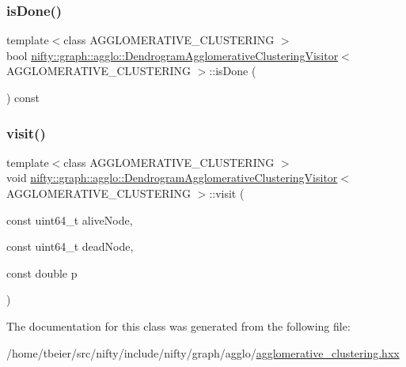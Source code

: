\subsubsection{\texorpdfstring{is\+Done()}{isDone()}}
{\footnotesize\ttfamily template$<$class A\+G\+G\+L\+O\+M\+E\+R\+A\+T\+I\+V\+E\+\_\+\+C\+L\+U\+S\+T\+E\+R\+I\+NG $>$ \\
bool \hyperlink{classnifty_1_1graph_1_1agglo_1_1DendrogramAgglomerativeClusteringVisitor}{nifty\+::graph\+::agglo\+::\+Dendrogram\+Agglomerative\+Clustering\+Visitor}$<$ A\+G\+G\+L\+O\+M\+E\+R\+A\+T\+I\+V\+E\+\_\+\+C\+L\+U\+S\+T\+E\+R\+I\+NG $>$\+::is\+Done (\begin{DoxyParamCaption}{ }\end{DoxyParamCaption}) const\hspace{0.3cm}{\ttfamily [inline]}}

\mbox{\label{classnifty_1_1graph_1_1agglo_1_1DendrogramAgglomerativeClusteringVisitor_a9335b363cf919ce31d4d366f169712ab}} 
\subsubsection{\texorpdfstring{visit()}{visit()}}
{\footnotesize\ttfamily template$<$class A\+G\+G\+L\+O\+M\+E\+R\+A\+T\+I\+V\+E\+\_\+\+C\+L\+U\+S\+T\+E\+R\+I\+NG $>$ \\
void \hyperlink{classnifty_1_1graph_1_1agglo_1_1DendrogramAgglomerativeClusteringVisitor}{nifty\+::graph\+::agglo\+::\+Dendrogram\+Agglomerative\+Clustering\+Visitor}$<$ A\+G\+G\+L\+O\+M\+E\+R\+A\+T\+I\+V\+E\+\_\+\+C\+L\+U\+S\+T\+E\+R\+I\+NG $>$\+::visit (\begin{DoxyParamCaption}\item[{const uint64\+\_\+t}]{alive\+Node,  }\item[{const uint64\+\_\+t}]{dead\+Node,  }\item[{const double}]{p }\end{DoxyParamCaption})\hspace{0.3cm}{\ttfamily [inline]}}



The documentation for this class was generated from the following file\+:\begin{DoxyCompactItemize}
\item 
/home/tbeier/src/nifty/include/nifty/graph/agglo/\hyperlink{agglomerative__clustering_8hxx}{agglomerative\+\_\+clustering.\+hxx}\end{DoxyCompactItemize}
